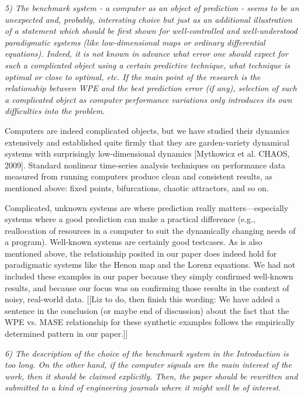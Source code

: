 \documentclass[12pt]{article}
\newcommand{\alert}[1]{{\color{red}#1}}
\begin{document}
\smallskip

\emph{5) The benchmark system - a computer as an object of prediction
  - seems to be an unexpected and, probably, interesting choice but
  just as an additional illustration of a statement which should be
  first shown for well-controlled and well-understood paradigmatic
  systems (like low-dimensional maps or ordinary differential
  equations). Indeed, it is not known in advance what error one should
  expect for such a complicated object using a certain predictive
  technique, what technique is optimal or close to optimal, etc. If
  the main point of the research is the relationship between WPE and
  the best prediction error (if any), selection of such a complicated
  object as computer performance variations only introduces its own
  difficulties into the problem.}

Computers are indeed complicated objects, but we have studied their
dynamics extensively and established quite firmly that they are
garden-variety dynamical systems with surprisingly low-dimensional
dynamics [Mytkowicz et al. CHAOS, 2009].  Standard nonlinear
time-series analysis techniques on performance data measured from
running computers produce clean and consistent results, as mentioned
above: fixed points, bifurcations, chaotic attractors, and so on.

Complicated, unknown systems are where prediction really
matters---especially systems where a good prediction can make a
practical difference (e.g., reallocation of resources in a computer to
suit the dynamically changing needs of a program).  Well-known systems
are certainly good testcases.  As is also mentioned above, the
relationship posited in our paper does indeed hold for paradigmatic
systems like the Henon map and the Lorenz equations.  We had not
included these examples in our paper because they simply confirmed
well-known results, and because our focus was on confirming those
results in the context of noisy, real-world data.  \alert{[[Liz to do,
      then finish this wording: We have added a sentence in the
      conclusion (or maybe end of discussion) about the fact that the
      WPE vs. MASE relationship for these synthetic examples follows
      the empirically determined pattern in our paper.]]}

\smallskip

\emph{6) The description of the choice of the benchmark system in the
  Introduction is too long. On the other hand, if the computer signals
  are the main interest of the work, then it should be claimed
  explicitly. Then, the paper should be rewritten and submitted to a
  kind of engineering journals where it might well be of interest.}
\end{document}

